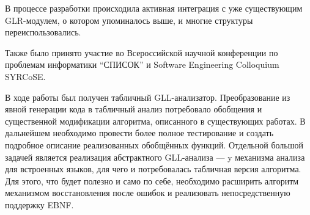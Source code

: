 В процессе разработки происходила активная интеграция с уже существующим GLR-модулем, о котором упоминалось выше, и многие структуры переиспользовались.

Также было принято участие во Всероссийской научной конференции по проблемам информатики ``СПИСОК'' и Software Engineering Colloquium SYRCoSE. 

В ходе работы был получен табличный GLL-анализатор. Преобразование из явной генерации кода в табличный анализ потребовало обобщения  и существенной модификации алгоритма, описанного в существующих работах. В дальнейшем необходимо провести более полное тестирование и создать подробное описание реализованных обобщённых функций. 
Отдельной большой задачей является реализация абстрактного GLL-анализа --- y механизма анализа для встроенных языков, для чего и потребовалась табличная версия алгоритма. Для этого, что будет полезно и само по себе, необходимо расширить алгоритм механизмом восстановления после ошибок и реализовать непосредственную поддержку EBNF.
 

